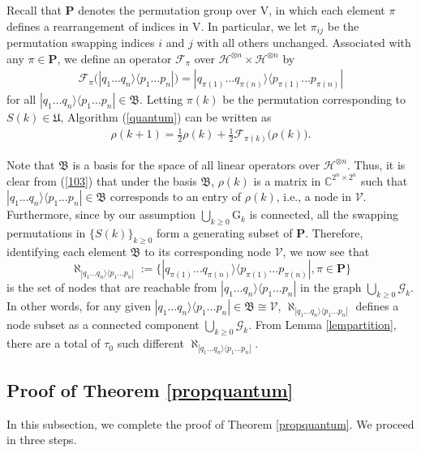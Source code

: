 \documentclass[a4paper, 11pt]{article}
\begin{document}
Recall that $\mathbf{P}$ denotes the permutation group over $\mathrm{V}$, in which each element $\pi$  defines a rearrangement  of indices in $\mathrm{V}$. {In particular,  we let $\pi_{ij}$ be the permutation swapping indices $i$ and $j$ with all others  unchanged.}   Associated with any $\pi\in \mathbf{P}$, we define an operator $\mathcal{F}_{\pi}$ over $\mathcal{H}^{\otimes n}\times \mathcal{H}^{\otimes n}$ by
\begin{align*}
\mathcal{F}_{\pi} \Big(|q_1 \dots q_n\rangle \langle p_1 \dots p_n| \Big)=|q_{\pi(1)} \dots q_{\pi(n)}\rangle \langle p_{\pi(1)} \dots p_{\pi(n)}|
\end{align*}
for all $ |q_1 \dots q_n\rangle \langle p_1 \dots p_n|\in \mathfrak{B}$. {Letting $\pi(k)$ be the permutation corresponding to $S(k)\in\mathfrak{U}$,} Algorithm (\ref{quantum}) can be written as
\begin{align}\label{103}
\rho(k+1)=\frac{1}{2} \rho(k)+ \frac{1}{2} \mathcal{F}_{\pi(k)} \big( \rho(k) \big).
\end{align}


Note that $\mathfrak{B}$ is a basis for the space of all linear operators over $\mathcal{H}^{\otimes n}$. Thus, it is clear from (\ref{103}) that under the basis $\mathfrak{B}$,   $\rho(k)$ is a matrix in  $\mathbb{C}^{2^n \times 2^n}$ such that $|q_1 \dots q_n\rangle \langle p_1 \dots p_n|\in \mathfrak{B}$ corresponds to an entry of $\rho(k)$, i.e., a node in $\mathcal{V}$. Furthermore,  since by our assumption $\bigcup_{k\geq 0}\mathrm{G}_k$ is connected, all the swapping permutations in $\{S(k)\}_{k\geq 0}$ form a generating subset of $\mathbf{P}$. Therefore, identifying each element $\mathfrak{B}$ to its corresponding node $\mathcal{V}$, we now see that
$$
\aleph_{|q_1 \dots q_n\rangle \langle p_1 \dots p_n|}:=\Big\{ |q_{\pi(1)} \dots q_{\pi(n)}\rangle \langle p_{\pi(1)} \dots p_{\pi(n)}|, \pi\in \mathbf{P} \Big\}
$$
is the set of nodes that are reachable from $|q_1 \dots q_n\rangle \langle p_1 \dots p_n|$ in the graph $\bigcup_{k\geq 0}\mathcal{G}_k$. In other words, for any given $|q_1 \dots q_n\rangle \langle p_1 \dots p_n| \in \mathfrak{B} \cong \mathcal{V}$, $\aleph_{|q_1 \dots q_n\rangle \langle p_1 \dots p_n|}$ defines a node subset as a connected component $\bigcup_{k\geq 0}\mathcal{G}_k$. From Lemma \ref{lempartition}, there are a total of $\tau_0$ such different $\aleph_{|q_1 \dots q_n\rangle \langle p_1 \dots p_n|}$.
\subsection{Proof of Theorem \ref{propquantum}}
In this subsection, we complete the proof of Theorem \ref{propquantum}. We proceed in {three} steps.
\end{document}
